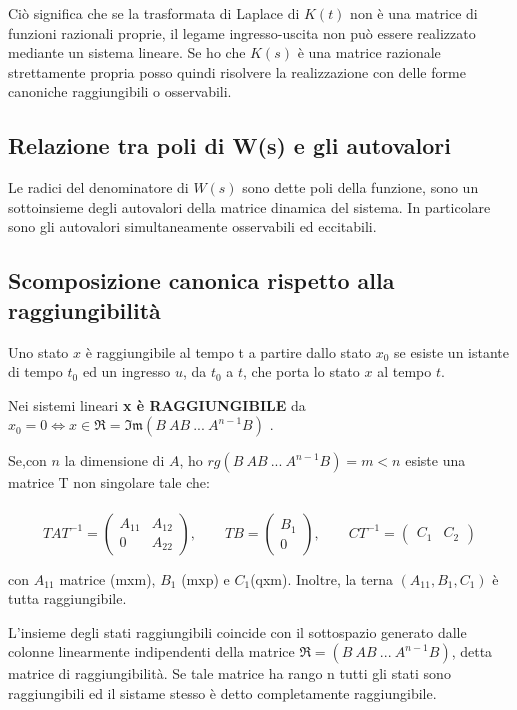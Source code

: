 \documentclass{article}
\begin{document}
Ciò significa che se la trasformata di Laplace di $K(t)$ non è una matrice di funzioni razionali proprie,
il legame ingresso-uscita non può essere realizzato mediante un sistema lineare.
Se ho che $K(s)$ è una matrice razionale strettamente propria posso quindi risolvere la realizzazione con delle forme canoniche raggiungibili o osservabili.


\subsection{Relazione tra poli di W(s) e gli autovalori}

Le radici del denominatore di $W(s)$ sono dette poli della funzione, sono un sottoinsieme degli autovalori della matrice dinamica del sistema.
In particolare sono gli autovalori simultaneamente osservabili ed eccitabili.


\subsection{Scomposizione canonica rispetto alla raggiungibilità}
Uno stato $x$ è raggiungibile al tempo t a partire dallo stato $x_0$ se esiste un istante di tempo $t_0 $
ed un ingresso $u$, da $t_0$ a $t$, che porta lo stato $x$ al tempo $t$.

Nei sistemi lineari \textbf{x è RAGGIUNGIBILE} da
$x_0=0 \Longleftrightarrow x \in \mathfrak{R} = \mathfrak{Im}(B\ AB\ ...\ A^{n-1}B)$ .

Se,con $n$ la dimensione di $A$, ho $rg(B\ AB\ ...\ A^{n-1}B)=m<n$ esiste una matrice T non singolare tale che:\\\\
\[
TAT^{-1}= \begin{pmatrix}
A_{11} & A_{12}\\
0 & A_{22}
\end{pmatrix}
,
\hspace{2em}
TB = \begin{pmatrix}
B_1\\
0
\end{pmatrix}
,
\hspace{2em}
CT^{-1} = \begin{pmatrix}
C_1 & C_2
\end{pmatrix}
\]

con $A_{11}$ matrice (mxm), $B_1$ (mxp) e $C_1$(qxm). Inoltre, la terna $(A_{11},B_1,C_1)$ è tutta raggiungibile.

L'insieme degli stati raggiungibili coincide con il sottospazio generato dalle colonne
linearmente indipendenti della matrice $\mathfrak{R}=(B\ AB\ ...\ A^{n-1}B)$, 
detta matrice di raggiungibilità. Se tale matrice ha rango n tutti gli stati sono raggiungibili
ed il sistame stesso è detto completamente raggiungibile.
\end{document}
